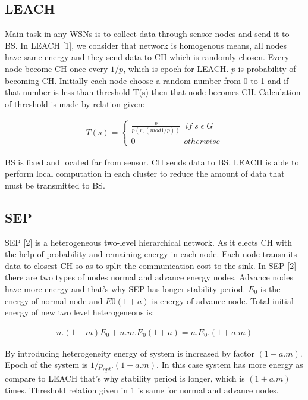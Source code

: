 \documentclass[10pt, conference, compsocconf]{IEEEtran}
\begin{document}
\subsection{LEACH}
Main task in any WSNs is to collect data through sensor nodes and send it to BS. In LEACH [1], we consider that network is homogenous means, all nodes have same energy and they send data to CH which is randomly chosen. Every node become CH once every $1/p$, which is epoch for LEACH. $p$ is probability of becoming CH. Initially each node choose a random number from 0 to 1 and if that number is less than threshold T(s) then that node becomes CH. Calculation of threshold is made by relation given:

\begin{eqnarray}
T (s)=
\begin{cases}\frac{p}{p(r, (mod1/p))}  \;\; if \; s \; \epsilon  \;G \\
0                   \;\;\;\;\;\;\; \;\;\;\;\;\;\; \;\;\;\;\;\;\;otherwise
\end{cases}
\end{eqnarray}

BS is fixed and located far from sensor. CH sends data to BS. LEACH is able to perform local computation in each cluster to reduce the amount of data that must be transmitted to BS.

\subsection{SEP}
SEP [2] is a heterogeneous two-level hierarchical network. As it elects CH with the help of probability and remaining energy in each node. Each node transmits data to closest CH so as to split the communication cost to the sink. In SEP [2] there are two types of nodes normal and advance energy nodes. Advance nodes have more energy and that's why SEP has longer stability period. $E_0$ is the energy of normal node and $E0 (1 + a)$ is energy of advance node. Total initial energy of new two level heterogeneous is:

\begin{eqnarray}
n . (1 - m) E_0 + n . m. E_0 (1 + a) = n . E_0 . (1 + a . m)
\end{eqnarray}

By introducing heterogeneity energy of system is increased by factor $(1 + a. m)$.  Epoch of the system is $1/ p_{opt} .(1 + a.m)$. In this case system has more energy as compare to LEACH that's why stability period is longer, which is $(1 + a . m)$ times. Threshold relation given in  1 is same for normal and advance nodes.
\end{document}
